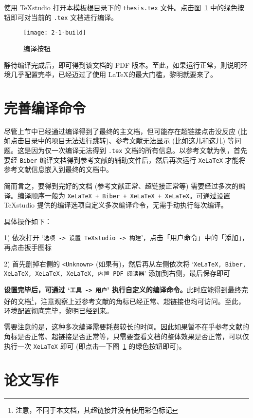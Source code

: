 使用 TeXstudio 打开本模板根目录下的 \texttt{thesis.tex} 文件。点击图~\ref{fig:build} 中的绿色按钮即可对当前的 \texttt{.tex} 文档进行编译。

\begin{figure}[htb]
    \centering
    \texttt{[image: 2-1-build]}
    \caption{\label{fig:build} 编译按钮}
\end{figure}

静待编译完成后，即可得到该文档的 PDF 版本。至此，如果运行正常，则说明环境几乎配置完毕，已经迈过了使用 \LaTeX 的最大门槛，黎明就要来了。

\section{完善编译命令}

尽管上节中已经通过编译得到了最终的主文档，但可能存在超链接点击没反应 (比如点击目录中的项目无法进行跳转)、参考文献无法显示 (比如这儿\cite{lecun2015deep}和这儿\cite{krizhevsky_imagenet_2012}) 等问题。这是因为仅一次编译无法得到 \texttt{.tex} 文档的所有信息。以参考文献为例，首先要经 \texttt{Biber} 编译文档得到参考文献的辅助文件后，然后再次运行 \texttt{XeLaTeX} 才能将参考文献信息嵌入到最终的文档中。

简而言之，要得到完好的文档 (参考文献正常、超链接正常等) 需要经过多次的编译。编译顺序一般为 \texttt{XeLaTeX + Biber + XeLaTeX + XeLaTeX}。可通过设置 TeXstudio 提供的编译选项自定义多次编译命令，无需手动执行每次编译。

具体操作如下：

1) 依次打开 `\texttt{选项 -> 设置 TeXstudio -> 构建}'，点击「用户命令」中的「添加」，再点击扳手图标

2) 首先删掉右侧的 \texttt{<Unknown>} (如果有)，然后再从左侧依次将 `\texttt{XeLaTeX, Biber, XeLaTeX, XeLaTeX, XeLaTeX, 内置 PDF 阅读器}' 添加到右侧，最后保存即可

\textbf{设置完毕后，可通过 `\texttt{工具 -> 用户}' 执行自定义的编译命令。}此时应能得到最终完好的文档\footnote{注意，不同于本文档，其超链接并没有使用彩色标记}，注意观察上述参考文献的角标已经正常、超链接也均可访问。至此，环境配置彻底完毕，黎明已经到来。

需要注意的是，这种多次编译需要耗费较长的时间。因此如果暂不在乎参考文献的角标是否正常、超链接是否正常等，只需要查看文档的整体效果是否正常，可以仅执行一次 \texttt{XeLaTeX} 即可 (即点击一下图~\ref{fig:build} 的绿色按钮即可)。

\section{论文写作}

